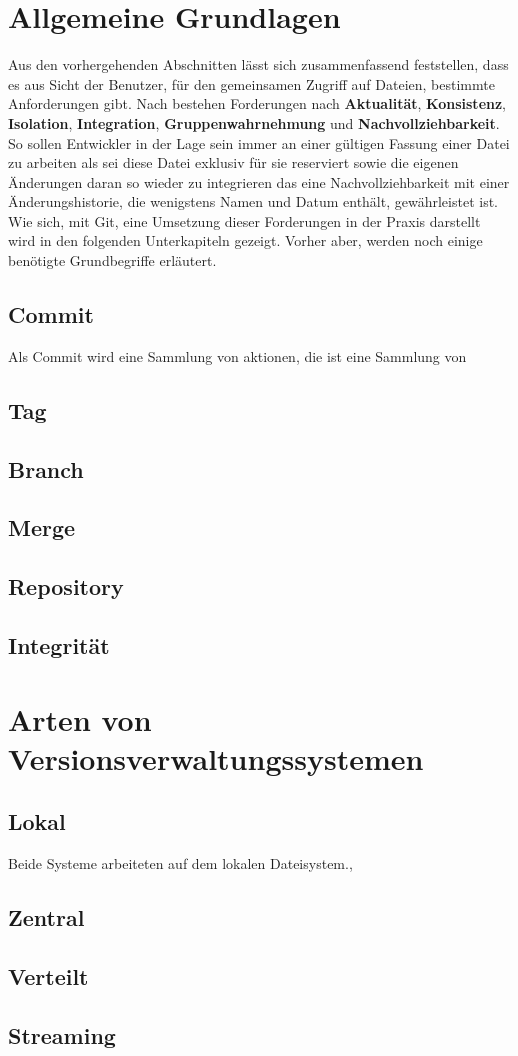 \section{Allgemeine Grundlagen}\label{sec:Grundlagen}
Aus den vorhergehenden Abschnitten lässt sich zusammenfassend feststellen, dass
es aus Sicht der Benutzer, für den gemeinsamen Zugriff auf Dateien, bestimmte
Anforderungen gibt. Nach \cite[S.~37]{hagen:1678} bestehen Forderungen nach
\textbf{Aktualität}, \textbf{Konsistenz}, \textbf{Isolation},
\textbf{Integration}, \textbf{Gruppenwahrnehmung} und
\textbf{Nachvollziehbarkeit}. So sollen Entwickler in der Lage sein immer an
einer gültigen Fassung einer Datei zu arbeiten als sei diese Datei exklusiv für
sie reserviert sowie die eigenen Änderungen daran so wieder zu integrieren das
eine Nachvollziehbarkeit mit einer Änderungshistorie, die wenigstens Namen und
Datum enthält, gewährleistet ist. Wie sich, mit Git, eine Umsetzung dieser
Forderungen in der Praxis darstellt wird in den folgenden Unterkapiteln
gezeigt. Vorher aber, werden noch einige benötigte Grundbegriffe erläutert.

\subsection{Commit}
Als Commit wird eine Sammlung von aktionen, die ist eine Sammlung von
\subsection{Tag}\label{sec:Tags}
\subsection{Branch}\label{sec:Branches}
\subsection{Merge}
\subsection{Repository}
\subsection{Integrität}

\section{Arten von Versionsverwaltungssystemen}
\subsection{Lokal}
Beide Systeme arbeiteten auf dem lokalen
Dateisystem.,
\subsection{Zentral}
\subsection{Verteilt}
\subsection{Streaming}

\label{sec:why}

